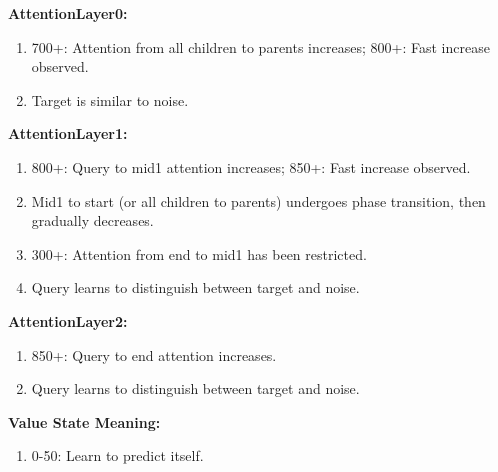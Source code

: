 \textbf{AttentionLayer0:}
\begin{enumerate}
    \item 700+: Attention from all children to parents increases; 800+: Fast increase observed.
    \item Target is similar to noise.
\end{enumerate}

\textbf{AttentionLayer1:}
\begin{enumerate}
    \item 800+: Query to mid1 attention increases; 850+: Fast increase observed.
    \item Mid1 to start (or all children to parents) undergoes phase transition, then gradually decreases.
    \item 300+: Attention from end to mid1 has been restricted.
    \item Query learns to distinguish between target and noise.
\end{enumerate}

\textbf{AttentionLayer2:}
\begin{enumerate}
    \item 850+: Query to end attention increases.
    \item Query learns to distinguish between target and noise.
\end{enumerate}

\textbf{Value State Meaning:}
\begin{enumerate}
    \item 0-50: Learn to predict itself.
\end{enumerate}